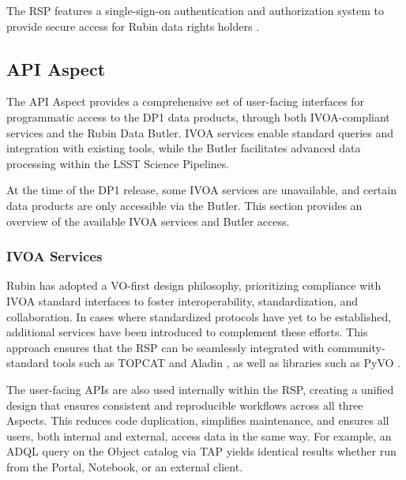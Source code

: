 The RSP features a single-sign-on authentication and authorization system to provide secure access for Rubin data rights holders \citep{rdo-013}.

\subsection{API Aspect}
\label{ssec:rsp_api}
The \gls{API} Aspect provides a comprehensive set of user-facing interfaces for programmatic access to the \gls{DP1} data products, through both \gls{IVOA}-compliant services and the Rubin Data Butler. IVOA services enable standard queries and integration with existing tools, while the Butler facilitates advanced data processing within the LSST Science Pipelines.

At the time of the \gls{DP1} release, some \gls{IVOA} services are unavailable, and certain data products are only accessible via the Butler.
This section provides an overview of the available \gls{IVOA} services and Butler access.

\subsubsection{IVOA Services}
\label{sssec:ivoa_services}

Rubin has adopted a \gls{VO}-first design philosophy, prioritizing compliance with \gls{IVOA} standard interfaces to foster interoperability, standardization, and collaboration.
In cases where standardized protocols have yet to be established, additional services have been introduced to complement these efforts.
This approach ensures that the RSP can be seamlessly integrated with community-standard tools such as \gls{TOPCAT} \citep{2011ascl.soft01010T} and Aladin \citep{2000A&AS..143...33B, 2014ASPC..485..277B, 2022ASPC..532....7B}, as well as libraries such as  PyVO \citep{2014ascl.soft02004G}.

The user-facing \glspl{API} are also used internally within the \gls{RSP}, creating a unified design that ensures consistent and reproducible workflows across all three Aspects.
This reduces code duplication, simplifies maintenance, and ensures all users, both internal and external, access data in the same way.
For example, an \gls{ADQL} query on the \gls{Object} catalog via TAP yields identical results whether run from the Portal, Notebook, or an external client.

